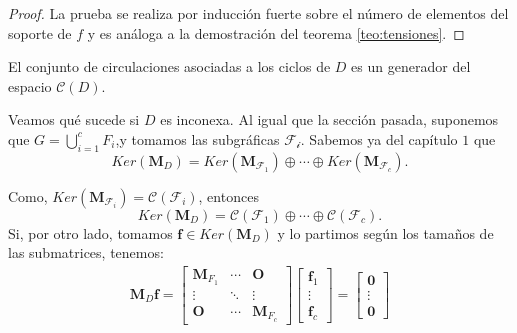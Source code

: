 \begin{proof}
La prueba se realiza por inducción fuerte sobre el número de elementos del soporte de $f$ y es análoga a la demostración del teorema \ref{teo:tensiones}.
\end{proof}

\begin{cor}
El conjunto de circulaciones asociadas a los ciclos de $D$ es un generador del espacio $\mathcal{C}(D)$.
\end{cor}

Veamos qué sucede si $D$ es inconexa. Al igual que la sección pasada, suponemos que $G =  \bigcup_{i=1}^{c}F_{i}$,y tomamos las subgráficas $\mathcal{F_{i}}$. Sabemos ya del capítulo $1$ que 
$$
Ker(\mathbf{M}_{D}) = Ker(\mathbf{M}_{\mathcal{F}_{1}}) \oplus \cdots \oplus Ker(\mathbf{M}_{\mathcal{F}_{c}}).
$$

Como,  $Ker(\mathbf{M}_{\mathcal{F}_{i}}) = \mathcal{C}(\mathcal{F}_{i})$, entonces $$Ker(\mathbf{M}_{D}) = \mathcal{C}(\mathcal{F}_{1}) \oplus \cdots \oplus \mathcal{C}(\mathcal{F}_{c}).$$ Si, por otro lado, tomamos $\mathbf{f} \in Ker(\mathbf{M}_{D})$ y lo partimos según los tamaños de las submatrices, tenemos:
\begin{align*}
    \mathbf{M}_{D}\mathbf{f} = \begin{bmatrix}
\mathbf{M}_{F_{1}} & \cdots  & \mathbf{O} \\ 
\vdots & \ddots  & \vdots \\ 
\mathbf{O} & \cdots & \mathbf{M}_{F_{c}}
\end{bmatrix} \begin{bmatrix}
\mathbf{f}_{1}\\
\vdots\\ 
\mathbf{f}_{c}
\end{bmatrix} = \begin{bmatrix}
\mathbf{0}\\
\vdots\\ 
\mathbf{0}
\end{bmatrix}
\end{align*}

